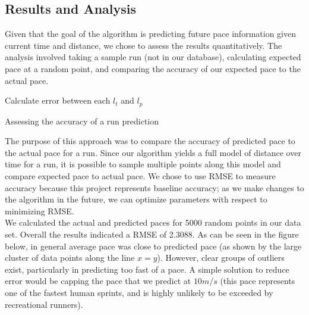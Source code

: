 \documentclass[twoside]{article}
\begin{document}
\begin{multicols}{2}

\section{Results and Analysis}

\indent Given that the goal of the algorithm is predicting future pace information given current time and distance, we chose to assess the results quantitatively. The analysis involved taking a sample run (not in our database), calculating expected pace at a random point, and comparing the accuracy of our expected pace to the actual pace.\\

\begin{algorithm}[H]

 Calculate error between each $l_t$ and $l_p$
 \caption{Assessing the accuracy of a run prediction}
\end{algorithm}

The purpose of this approach was to compare the accuracy of predicted pace to the actual pace for a run. Since our algorithm yields a full model of distance over time for a run, it is possible to sample multiple points along this model and compare expected pace to actual pace. We chose to use RMSE to measure accuracy because this project represents baseline accuracy; as we make changes to the algorithm in the future, we can optimize parameters with respect to minimizing RMSE.\\

We calculated the actual and predicted paces for 5000 random points in our data set. Overall the results indicated a RMSE of 2.3088. As can be seen in the figure below, in general average pace was close to predicted pace (as shown by the large cluster of data points along the line $x=y$). However, clear groups of outliers exist, particularly in predicting too fast of a pace. A simple solution to reduce error would be capping the pace that we predict at $10 m/s$ (this pace represents one of the fastest human sprints, and is highly unlikely to be exceeded by recreational runners).


\end{multicols}
\end{document}
